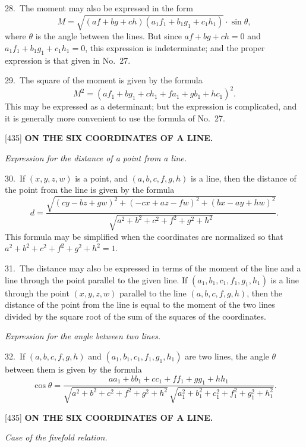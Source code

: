 \documentclass[12pt,a4paper]{article}
\newcommand{\paperref}[1]{\textup{[#1]}}
\theoremstyle{definition}
\begin{document}
28.~The moment may also be expressed in the form
\[
M = \sqrt{(af + bg + ch)(a_1 f_1 + b_1 g_1 + c_1 h_1)} \cdot \sin\theta,
\]
where $\theta$ is the angle between the lines. But since $af + bg + ch = 0$ and $a_1 f_1 + b_1 g_1 + c_1 h_1 = 0$, this expression is indeterminate; and the proper expression is that given in No.~27.

29.~The square of the moment is given by the formula
\[
M^2 = (a f_1 + b g_1 + c h_1 + f a_1 + g b_1 + h c_1)^2.
\]
This may be expressed as a determinant; but the expression is complicated, and it is generally more convenient to use the formula of No.~27.

\newpage
\setcounter{page}{78}

\noindent\paperref{435}\quad
\textbf{ON THE SIX COORDINATES OF A LINE.}

\textit{Expression for the distance of a point from a line.}

30.~If $(x, y, z, w)$ is a point, and $(a, b, c, f, g, h)$ is a line, then the distance of the point from the line is given by the formula
\[
d = \frac{\sqrt{(c y - b z + g w)^2 + (-c x + a z - f w)^2 + (b x - a y + h w)^2}}{\sqrt{a^2 + b^2 + c^2 + f^2 + g^2 + h^2}}.
\]
This formula may be simplified when the coordinates are normalized so that $a^2 + b^2 + c^2 + f^2 + g^2 + h^2 = 1$.

31.~The distance may also be expressed in terms of the moment of the line and a line through the point parallel to the given line. If $(a_1, b_1, c_1, f_1, g_1, h_1)$ is a line through the point $(x, y, z, w)$ parallel to the line $(a, b, c, f, g, h)$, then the distance of the point from the line is equal to the moment of the two lines divided by the square root of the sum of the squares of the coordinates.

\textit{Expression for the angle between two lines.}

32.~If $(a, b, c, f, g, h)$ and $(a_1, b_1, c_1, f_1, g_1, h_1)$ are two lines, the angle $\theta$ between them is given by the formula
\[
\cos\theta = \frac{a a_1 + b b_1 + c c_1 + f f_1 + g g_1 + h h_1}{\sqrt{a^2 + b^2 + c^2 + f^2 + g^2 + h^2}\,\sqrt{a_1^2 + b_1^2 + c_1^2 + f_1^2 + g_1^2 + h_1^2}}.
\]

\newpage
\setcounter{page}{79}

\noindent\paperref{435}\quad
\textbf{ON THE SIX COORDINATES OF A LINE.}

\textit{Case of the fivefold relation.}
\end{document}
